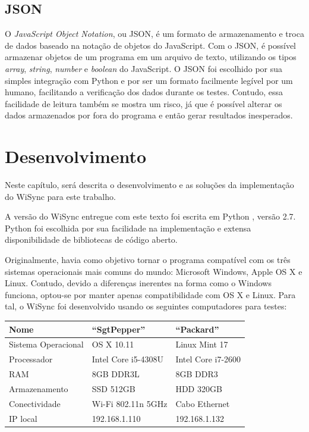 \documentclass[12pt,a4paper]{ufpr}
\begin{document}
\section {JSON}
O \textit{JavaScript Object Notation}, ou JSON, é um formato de armazenamento e troca de dados baseado na notação de objetos do JavaScript. Com o JSON, é possível armazenar objetos de um programa em um arquivo de texto, utilizando os tipos \textit{array}, \textit{string}, \textit{number} e \textit{boolean} do JavaScript\cite{json}.
O JSON foi escolhido por sua simples integração com Python e por ser um formato facilmente legível por um humano, facilitando a verificação dos dados durante os testes.
Contudo, essa facilidade de leitura também se mostra um risco, já que é possível alterar os dados armazenados por fora do programa e então gerar resultados inesperados.


\chapter{Desenvolvimento}
\label{desenvolvimento}
Neste capítulo, será descrita o desenvolvimento e as soluções da implementação do WiSync para este trabalho.

A versão do WiSync entregue com este texto foi escrita em Python \cite{python}, versão 2.7.
Python foi escolhida por sua facilidade na implementação e extensa disponibilidade de bibliotecas de código aberto.

Originalmente, havia como objetivo tornar o programa compatível com os três sistemas operacionais mais comuns do mundo: Microsoft Windows, Apple OS X e Linux.
Contudo, devido a diferenças inerentes na forma como o Windows funciona, optou-se por manter apenas compatibilidade com OS X e Linux.
Para tal, o WiSync foi desenvolvido usando os seguintes computadores para testes:

\begin{center}
  \begin{tabular}{ l | l | l }
    \hline
    \textbf{Nome} & ``SgtPepper'' & ``Packard'' \\ \hline \hline
    Sistema Operacional & OS X 10.11 & Linux Mint 17 \\ \hline
    Processador & Intel Core i5-4308U & Intel Core i7-2600 \\ \hline
    RAM & 8GB DDR3L & 8GB DDR3 \\ \hline
    Armazenamento & SSD 512GB & HDD 320GB \\ \hline
    Conectividade & Wi-Fi 802.11n 5GHz & Cabo Ethernet \\ \hline
    IP local & 192.168.1.110 & 192.168.1.132 \\
    \hline
  \end{tabular}
\end{center}
\end{document}
